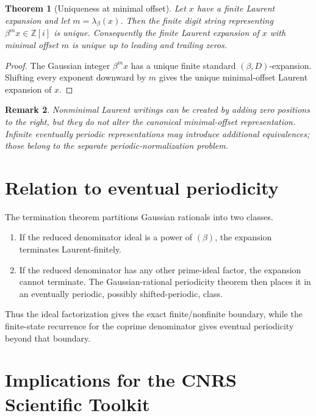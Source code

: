 \documentclass[11pt]{article}
\newtheorem{theorem}{Theorem}[section]
\newtheorem{remark}[theorem]{Remark}
\theoremstyle{definition}
\newcommand{\Zi}{\mathbb{Z}[i]}
\begin{document}
\begin{theorem}[Uniqueness at minimal offset]
Let $x$ have a finite Laurent expansion and let $m=\lambda_\beta(x)$.  Then the finite digit string representing $\beta^m x\in\Zi$ is unique.  Consequently the finite Laurent expansion of $x$ with minimal offset $m$ is unique up to leading and trailing zeros.
\end{theorem}

\begin{proof}
The Gaussian integer $\beta^m x$ has a unique finite standard $(\beta,D)$-expansion.  Shifting every exponent downward by $m$ gives the unique minimal-offset Laurent expansion of $x$.
\end{proof}

\begin{remark}
Nonminimal Laurent writings can be created by adding zero positions to the right, but they do not alter the canonical minimal-offset representation.  Infinite eventually periodic representations may introduce additional equivalences; those belong to the separate periodic-normalization problem.
\end{remark}

\section{Relation to eventual periodicity}

The termination theorem partitions Gaussian rationals into two classes.

\begin{enumerate}
\item If the reduced denominator ideal is a power of $(\beta)$, the expansion terminates Laurent-finitely.
\item If the reduced denominator has any other prime-ideal factor, the expansion cannot terminate.  The Gaussian-rational periodicity theorem then places it in an eventually periodic, possibly shifted-periodic, class.
\end{enumerate}

Thus the ideal factorization gives the exact finite/nonfinite boundary, while the finite-state recurrence for the coprime denominator gives eventual periodicity beyond that boundary.

\section{Implications for the CNRS Scientific Toolkit}
\end{document}
